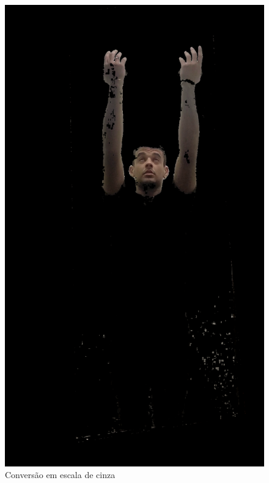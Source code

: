 \begin{figure}[H]
    \centering
    \caption{Conversão em escala de cinza}
        \begin{minipage}{\sizeImg\textwidth}
            \includegraphics[width=\textwidth]{figuras/mao_barra/skin.png}
        \end{minipage}
        \begin{minipage}{\sizeImg\textwidth}

\end{minipage}
\end{figure}
